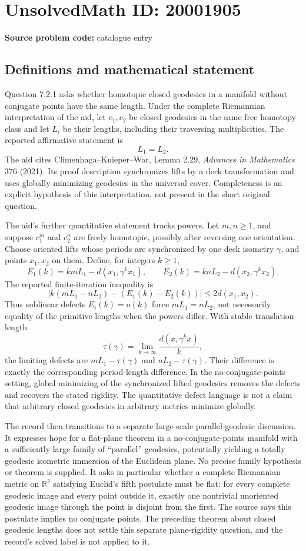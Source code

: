 \documentclass[11pt]{article}
\begin{document}
\section*{UnsolvedMath ID: 20001905}
\textbf{Source problem code:} catalogue entry
\subsection{Definitions and mathematical statement}
Question 7.2.1 asks whether homotopic closed geodesics in a manifold without conjugate points have the same length. Under the complete Riemannian interpretation of the aid, let \(c_1,c_2\) be closed geodesics in the same free homotopy class and let \(L_i\) be their lengths, including their traversing multiplicities. The reported affirmative statement is
\[
 L_1=L_2.
\]
The aid cites Climenhaga--Knieper--War, Lemma 2.29, \emph{Advances in Mathematics} 376 (2021). Its proof description synchronizes lifts by a deck transformation and uses globally minimizing geodesics in the universal cover. Completeness is an explicit hypothesis of this interpretation, not present in the short original question.

The aid's further quantitative statement tracks powers. Let \(m,n\geq1\), and suppose \(c_1^m\) and \(c_2^n\) are freely homotopic, possibly after reversing one orientation. Choose oriented lifts whose periods are synchronized by one deck isometry \(\gamma\), and points \(x_1,x_2\) on them. Define, for integers \(k\geq1\),
\[
 E_1(k)=kmL_1-d(x_1,\gamma^k x_1),\qquad
 E_2(k)=knL_2-d(x_2,\gamma^k x_2).
\]
The reported finite-iteration inequality is
\[
 \left|k(mL_1-nL_2)-(E_1(k)-E_2(k))\right|
 \leq2d(x_1,x_2).
\]
Thus sublinear defects \(E_i(k)=o(k)\) force \(mL_1=nL_2\), not necessarily equality of the primitive lengths when the powers differ. With stable translation length
\[
 \tau(\gamma)=\lim_{k\to\infty}\frac{d(x,\gamma^k x)}k,
\]
the limiting defects are \(mL_1-\tau(\gamma)\) and \(nL_2-\tau(\gamma)\). Their difference is exactly the corresponding period-length difference. In the no-conjugate-points setting, global minimizing of the synchronized lifted geodesics removes the defects and recovers the stated rigidity. The quantitative defect language is not a claim that arbitrary closed geodesics in arbitrary metrics minimize globally.

The record then transitions to a separate large-scale parallel-geodesic discussion. It expresses hope for a flat-plane theorem in a no-conjugate-points manifold with a sufficiently large family of ``parallel'' geodesics, potentially yielding a totally geodesic isometric immersion of the Euclidean plane. No precise family hypothesis or theorem is supplied. It asks in particular whether a complete Riemannian metric on \(\mathbb R^2\) satisfying Euclid's fifth postulate must be flat: for every complete geodesic image and every point outside it, exactly one nontrivial unoriented geodesic image through the point is disjoint from the first. The source says this postulate implies no conjugate points. The preceding theorem about closed geodesic lengths does not settle this separate plane-rigidity question, and the record's solved label is not applied to it.
\end{document}
